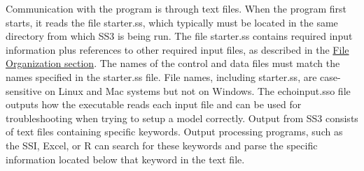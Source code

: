 Communication with the program is through text files. When the program first starts, it reads the file starter.ss, which typically must be located in the same directory from which SS3 is being run. The file starter.ss contains required input information plus references to other required input files, as described in the \hyperref[FileOrganization]{File Organization section}. The names of the control and data files must match the names specified in the starter.ss file. File names, including starter.ss, are case-sensitive on Linux and Mac systems but not on Windows. The echoinput.sso file outputs how the executable reads each input file and can be used for troubleshooting when trying to setup a model correctly. Output from SS3 consists of text files containing specific keywords. Output processing programs, such as the SSI, Excel, or R can search for these keywords and parse the specific information located below that keyword in the text file.

\pagebreak
